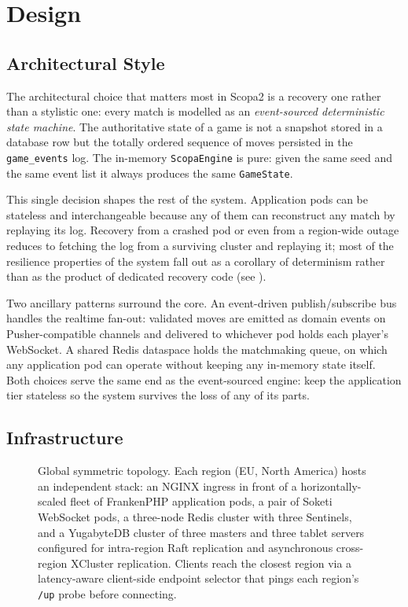 \documentclass{scrartcl}
\newcommand{\figtikz}[2]{%
    \begin{figure}
        \centering
        \resizebox{\textwidth}{!}{}
        \caption{#2}
        \label{fig:#1}
    \end{figure}%
}
\begin{document}
\section{Design}\label{design}


\subsection{Architectural Style}\label{architecture}

The architectural choice that matters most in Scopa2 is a recovery one
rather than a stylistic one: every match is modelled as an
\emph{event-sourced deterministic state machine}. The authoritative
state of a game is not a snapshot stored in a database row but the
totally ordered sequence of moves persisted in the
\texttt{game\_events} log. The in-memory \texttt{ScopaEngine} is pure:
given the same seed and the same event list it always produces the
same \texttt{GameState}.

This single decision shapes the rest of the system. Application pods
can be stateless and interchangeable because any of them can
reconstruct any match by replaying its log. Recovery from a crashed
pod or even from a region-wide outage reduces to fetching the log from
a surviving cluster and replaying it; most of the resilience
properties of the system fall out as a corollary of determinism rather
than as the product of dedicated recovery code
(see ).

Two ancillary patterns surround the core. An event-driven
publish/subscribe bus handles the realtime fan-out: validated moves are
emitted as domain events on Pusher-compatible channels and delivered to
whichever pod holds each player's WebSocket. A shared Redis dataspace
holds the matchmaking queue, on which any application pod can operate
without keeping any in-memory state itself. Both choices serve the same
end as the event-sourced engine: keep the application tier stateless so
the system survives the loss of any of its parts.

\subsection{Infrastructure}\label{infrastructure}

\figtikz{topology}{Global symmetric topology. Each region (EU,
North America) hosts an independent stack: an NGINX ingress in front of
a horizontally-scaled fleet of FrankenPHP application pods, a pair of
Soketi WebSocket pods, a three-node Redis cluster with three Sentinels,
and a YugabyteDB cluster of three masters and three tablet servers
configured for intra-region Raft replication and asynchronous
cross-region XCluster replication. Clients reach the closest region via
a latency-aware client-side endpoint selector that pings each region's
\texttt{/up} probe before connecting.}
\end{document}
